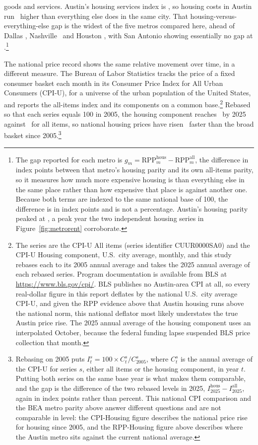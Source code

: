 goods and services. Austin's housing services index is
\NColRppHousingAustin, so housing costs in Austin run
\NColRppGapAustin\ higher than everything else does in the same city. That
housing-versus-everything-else gap is the widest of the five metros compared
here, ahead of Dallas \NColRppGapDallas, Nashville \NColRppGapNashville\ and
Houston \NColRppGapHouston, with San Antonio showing essentially no gap at
\NColRppGapSanantonio.\footnote{The gap reported for each metro is
\(g_m = \mathrm{RPP}^{\mathrm{hous}}_m - \mathrm{RPP}^{\mathrm{all}}_m\), the
difference in index points between that metro's housing parity and its own
all-items parity, so it measures how much more expensive housing is than
everything else in the same place rather than how expensive that place is
against another one. Because both terms are indexed to the same national base
of 100, the difference is in index points and is not a percentage. Austin's
housing parity peaked at \NColRppAustinHousingPeak, a peak year the two
independent housing series in Figure~\ref{fig:metrorent} corroborate.}

The national price record shows the same relative movement over time, in a
different measure. The Bureau of Labor Statistics tracks the price of a fixed
consumer basket each month in its Consumer Price Index for All Urban Consumers
(CPI-U), for a universe of the urban population of the United States, and
reports the all-items index and its components on a common
base.\footnote{The series are the CPI-U All items (series identifier
CUUR0000SA0) and the CPI-U Housing component, U.S.\ city average, monthly, and
this study rebases each to its 2005 annual average and takes the 2025 annual
average of each rebased series. Program documentation is available from BLS at
\url{https://www.bls.gov/cpi/}. BLS publishes no Austin-area CPI at all, so
every real-dollar figure in this report deflates by the national U.S.\ city
average CPI-U, and given the RPP evidence above that Austin housing runs above
the national norm, this national deflator most likely understates the true
Austin price rise. The 2025 annual average of the housing component uses an
interpolated October, because the federal funding lapse suspended BLS price
collection that month.} Rebased so that each series equals 100 in 2005, the
housing component reaches \NColCpiHousingIndexTwoZeroTwoFive\ by 2025 against
\NColCpiAllitemsIndexTwoZeroTwoFive\ for all items, so national housing prices
have risen \NColCpiHousingGapTwoZeroTwoFive\ faster than the broad basket since
2005.\footnote{Rebasing on 2005 puts \(I^{s}_{t} = 100 \times C^{s}_{t} /
C^{s}_{2005}\), where \(C^{s}_{t}\) is the annual average of the CPI-U for
series \(s\), either all items or the housing component, in year \(t\).
Putting both series on the same base year is what makes them comparable, and
the gap is the difference of the two rebased levels in 2025,
\(I^{\mathrm{hous}}_{2025} - I^{\mathrm{all}}_{2025}\), again in index points
rather than percent. This national CPI comparison and the BEA metro parity
above answer different questions and are not comparable in level: the
CPI-Housing figure describes the national price rise for housing since 2005,
and the RPP-Housing figure above describes where the Austin metro sits against
the current national average.}

